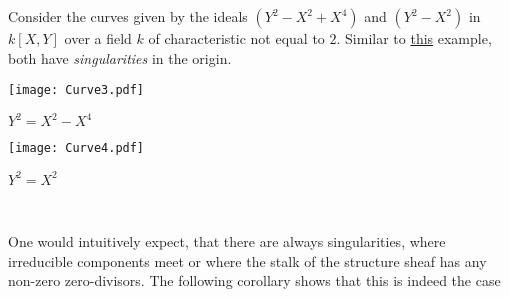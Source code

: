\documentclass[a4paper,parskip=half,numbers=enddot, DIV=12, headheight=30pt]{scrreprt}
\begin{document}
\begin{example*}%
    Consider the curves given by the ideals $(Y^2-X^2+X^4)$ and $(Y^2-X^2)$ in $k[X,Y]$ over a field $k$ of characteristic not equal to $2$. Similar to \hyperref[ex:singularPoints]{this} example, both have \emph{singularities} in the origin.
     \begin{center}
    	\begin{minipage}{0.42\textwidth}
    		\centering
    		\texttt{[image: Curve3.pdf]}
    		
    		$Y^2=X^2-X^4$
    	\end{minipage}
    	\begin{minipage}{0.42\textwidth}
    		\centering
    		\texttt{[image: Curve4.pdf]}
    		
    		$Y^2=X^2$
    	\end{minipage}\\    	
    	\phantom{we need more space}
    \end{center}    
\end{example*}
One would intuitively expect, that there are always singularities, where irreducible components meet or where the stalk of the structure sheaf has any non-zero zero-divisors. The following corollary shows that this is indeed the case
\end{document}
